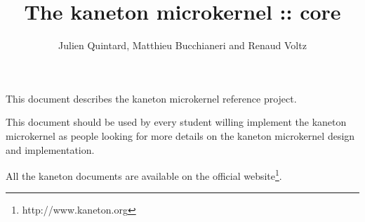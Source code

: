 %
%
%
%
%
%

%
%

\def\path{../..}

%
%



%
%

\rhead{}

%
%

\title{The kaneton microkernel :: core
       \logos}

%
%

\author{\small{Julien Quintard},
        \small{Matthieu Bucchianeri} and
        \small{Renaud Voltz}}

%
%



%
%

\maketitle

%
%

This document describes the kaneton microkernel reference project.

\-

This document should be used by every student willing implement the
kaneton microkernel as people looking for more details on the kaneton
microkernel design and implementation.

\-

All the kaneton documents are available on
  the official website\footnote{http://www.kaneton.org}.

%
%

\toc

%
%















